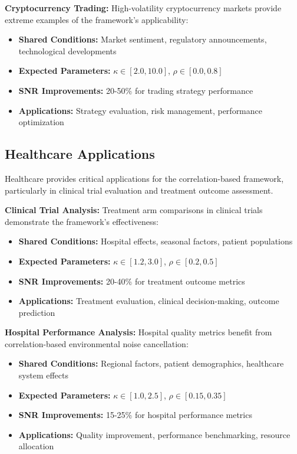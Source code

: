 \textbf{Cryptocurrency Trading:}
High-volatility cryptocurrency markets provide extreme examples of the framework's applicability:
\begin{itemize}
    \item \textbf{Shared Conditions:} Market sentiment, regulatory announcements, technological developments
    \item \textbf{Expected Parameters:} $\kappa \in [2.0, 10.0]$, $\rho \in [0.0, 0.8]$
    \item \textbf{SNR Improvements:} 20-50\% for trading strategy performance
    \item \textbf{Applications:} Strategy evaluation, risk management, performance optimization
\end{itemize}

\subsection{Healthcare Applications}

Healthcare provides critical applications for the correlation-based framework, particularly in clinical trial evaluation and treatment outcome assessment.

\textbf{Clinical Trial Analysis:}
Treatment arm comparisons in clinical trials demonstrate the framework's effectiveness:
\begin{itemize}
    \item \textbf{Shared Conditions:} Hospital effects, seasonal factors, patient populations
    \item \textbf{Expected Parameters:} $\kappa \in [1.2, 3.0]$, $\rho \in [0.2, 0.5]$
    \item \textbf{SNR Improvements:} 20-40\% for treatment outcome metrics
    \item \textbf{Applications:} Treatment evaluation, clinical decision-making, outcome prediction
\end{itemize}

\textbf{Hospital Performance Analysis:}
Hospital quality metrics benefit from correlation-based environmental noise cancellation:
\begin{itemize}
    \item \textbf{Shared Conditions:} Regional factors, patient demographics, healthcare system effects
    \item \textbf{Expected Parameters:} $\kappa \in [1.0, 2.5]$, $\rho \in [0.15, 0.35]$
    \item \textbf{SNR Improvements:} 15-25\% for hospital performance metrics
    \item \textbf{Applications:} Quality improvement, performance benchmarking, resource allocation
\end{itemize}

